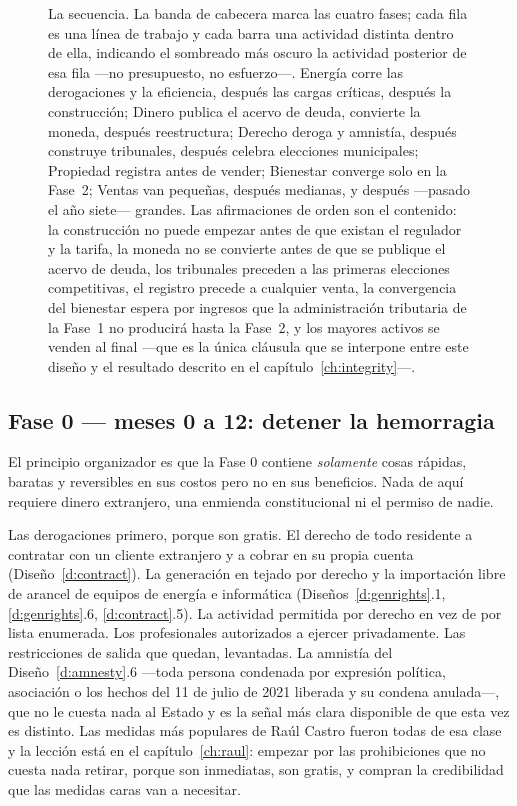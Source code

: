 \begin{figure}[t]
\caption{La secuencia. La banda de cabecera marca las cuatro fases; cada fila es una línea de
trabajo y cada barra una actividad distinta dentro de ella, indicando el sombreado más oscuro la
actividad posterior de esa fila ---no presupuesto, no esfuerzo---. Energía corre las derogaciones y
la eficiencia, después las cargas críticas, después la construcción; Dinero publica el acervo de
deuda, convierte la moneda, después reestructura; Derecho deroga y amnistía, después construye
tribunales, después celebra elecciones municipales; Propiedad registra antes de vender; Bienestar
converge solo en la Fase~2; Ventas van pequeñas, después medianas, y después ---pasado el año
siete--- grandes. Las afirmaciones de orden son el contenido: la construcción no puede empezar
antes de que existan el regulador y la tarifa, la moneda no se convierte antes de que se publique
el acervo de deuda, los tribunales preceden a las primeras elecciones competitivas, el registro
precede a cualquier venta, la convergencia del bienestar espera por ingresos que la administración
tributaria de la Fase~1 no producirá hasta la Fase~2, y los mayores activos se venden al final
---que es la única cláusula que se interpone entre este diseño y el resultado descrito en el
capítulo~\ref{ch:integrity}---.}
\label{fig:sequence}
\end{figure}

\subsection*{Fase 0 --- meses 0 a 12: detener la hemorragia}

El principio organizador es que la Fase 0 contiene \emph{solamente} cosas rápidas, baratas y
reversibles en sus costos pero no en sus beneficios. Nada de aquí requiere dinero extranjero, una
enmienda constitucional ni el permiso de nadie.

Las derogaciones primero, porque son gratis. El derecho de todo residente a contratar con un
cliente extranjero y a cobrar en su propia cuenta (Diseño~\ref{d:contract}). La generación en tejado
por derecho y la importación libre de arancel de equipos de energía e informática
(Diseños~\ref{d:genrights}.1, \ref{d:genrights}.6, \ref{d:contract}.5). La actividad permitida por
derecho en vez de por lista enumerada. Los profesionales autorizados a ejercer privadamente. Las
restricciones de salida que quedan, levantadas. La amnistía del Diseño~\ref{d:amnesty}.6 ---toda
persona condenada por expresión política, asociación o los hechos del 11 de julio de 2021 liberada y
su condena anulada---, que no le cuesta nada al Estado y es la señal más clara disponible de que
esta vez es distinto. Las medidas más populares de Raúl Castro fueron todas de esa clase y la
lección está en el capítulo~\ref{ch:raul}: empezar por las prohibiciones que no cuesta nada retirar,
porque son inmediatas, son gratis, y compran la credibilidad que las medidas caras van a necesitar.

